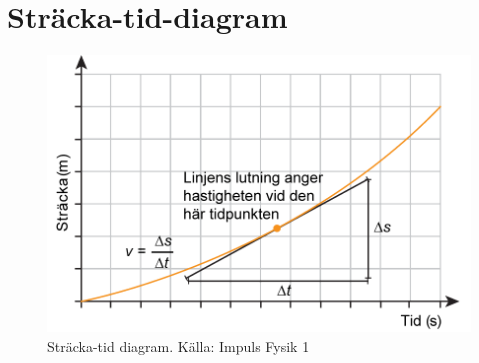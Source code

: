 \documentclass[11pt]{article}
\begin{document}
    \section{Sträcka-tid-diagram}
    \begin{figure}[!h]
        \includegraphics[width=\textwidth]{images/chapter3/DistTime.png}
        \caption{Sträcka-tid diagram. Källa: Impuls Fysik 1}
    \end{figure}
    \clearpage
\end{document}
